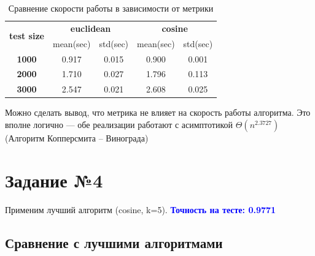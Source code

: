 \documentclass[12pt,fleqn]{article}
\begin{document}
\begin{table}[htb]
    \centering
    \begin{tabular}{|c|c|c|c|c|}
    \hline
    \multirow{2}{*}{\textbf{test size}} & \multicolumn{2}{c|}{\textbf{euclidean}} & \multicolumn{2}{c|}{\textbf{cosine}} \\ \cline{2-5} 
                                        & mean(sec)           & std(sec)          & mean(sec)         & std(sec)         \\ \hline
    \textbf{1000}                       & 0.917               & 0.015             & 0.900             & 0.001            \\ \hline
    \textbf{2000}                       & 1.710               & 0.027             & 1.796             & 0.113            \\ \hline
    \textbf{3000}                       & 2.547               & 0.021             & 2.608             & 0.025           \\ \hline
    \end{tabular}
    \caption{Сравнение скорости работы в зависимости от метрики}
\end{table}

Можно сделать вывод, что метрика не влияет на скорость работы алгоритма. Это вполне логично ---
 обе реализации работают с асимптотикой $\Theta(n^{2.3727})$ (Алгоритм Копперсмита -- Винограда)

\section{Задание №4}
Применим лучший алгоритм (cosine, k=5).
\textcolor{blue}{\textbf{Точность на тесте: 0.9771}}

\subsection{Сравнение с лучшими алгоритмами}
\end{document}
